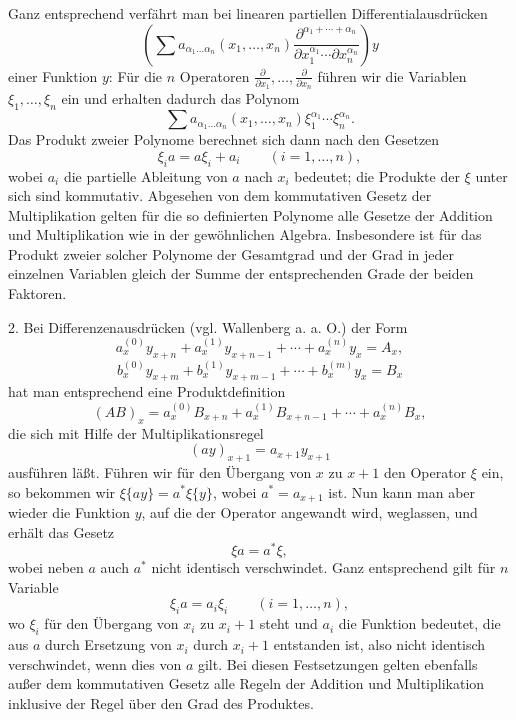 \documentclass[11pt]{article}
\providecommand{\p}{\partial}
\providecommand{\p}{\partial}
\begin{document}
Ganz entsprechend verfährt man bei linearen partiellen Differentialausdrücken
\[
 \left(\sum a_{\alpha_1\ldots\alpha_n}(x_1,\ldots,x_n)
 \frac{\p^{\alpha_1+\cdots+\alpha_n}}
 {\p x_1^{\alpha_1}\cdots\p x_n^{\alpha_n}}\right)y
\]
einer Funktion $y$: Für die $n$ Operatoren $\frac{\p}{\p x_1},\ldots,\frac{\p}{\p x_n}$ führen wir die Variablen $\xi_1,\ldots,\xi_n$ ein und erhalten dadurch das Polynom
\[
 \sum a_{\alpha_1\ldots\alpha_n}(x_1,\ldots,x_n)
 \xi_1^{\alpha_1}\cdots\xi_n^{\alpha_n}.
\]
Das Produkt zweier Polynome berechnet sich dann nach den Gesetzen
\begin{equation}
 \xi_i a=a\xi_i+a_i \qquad (i=1,\ldots,n),
\tag{2}
\end{equation}
wobei $a_i$ die partielle Ableitung von $a$ nach $x_i$ bedeutet; die Produkte der $\xi$ unter sich sind kommutativ. Abgesehen von dem kommutativen Gesetz der Multiplikation gelten für die so definierten Polynome alle Gesetze der Addition und Multiplikation wie in der gewöhnlichen Algebra. Insbesondere ist für das Produkt zweier solcher Polynome der Gesamtgrad und der Grad in jeder einzelnen Variablen gleich der Summe der entsprechenden Grade der beiden Faktoren.

2. Bei Differenzenausdrücken (vgl. Wallenberg a. a. O.) der Form
\[
 a_x^{(0)}y_{x+n}+a_x^{(1)}y_{x+n-1}+\cdots+a_x^{(n)}y_x=A_x,
\]
\[
 b_x^{(0)}y_{x+m}+b_x^{(1)}y_{x+m-1}+\cdots+b_x^{(m)}y_x=B_x
\]
hat man entsprechend eine Produktdefinition
\[
 (AB)_x=a_x^{(0)}B_{x+n}+a_x^{(1)}B_{x+n-1}+\cdots+a_x^{(n)}B_x,
\]
die sich mit Hilfe der Multiplikationsregel
\[
 (ay)_{x+1}=a_{x+1}y_{x+1}
\]
ausführen läßt. Führen wir für den Übergang von $x$ zu $x+1$ den Operator $\xi$ ein, so bekommen wir $\xi\{ay\}=a^*\xi\{y\}$, wobei $a^*=a_{x+1}$ ist. Nun kann man aber wieder die Funktion $y$, auf die der Operator angewandt wird, weglassen, und erhält das Gesetz
\begin{equation}
 \xi a=a^*\xi,
\tag{3}
\end{equation}
wobei neben $a$ auch $a^*$ nicht identisch verschwindet. Ganz entsprechend gilt für $n$ Variable
\begin{equation}
 \xi_i a=a_i\xi_i\qquad (i=1,\ldots,n),
\tag{4}
\end{equation}
wo $\xi_i$ für den Übergang von $x_i$ zu $x_i+1$ steht und $a_i$ die Funktion bedeutet, die aus $a$ durch Ersetzung von $x_i$ durch $x_i+1$ entstanden ist, also nicht identisch verschwindet, wenn dies von $a$ gilt. Bei diesen Festsetzungen gelten ebenfalls außer dem kommutativen Gesetz alle Regeln der Addition und Multiplikation inklusive der Regel über den Grad des Produktes.
\end{document}
